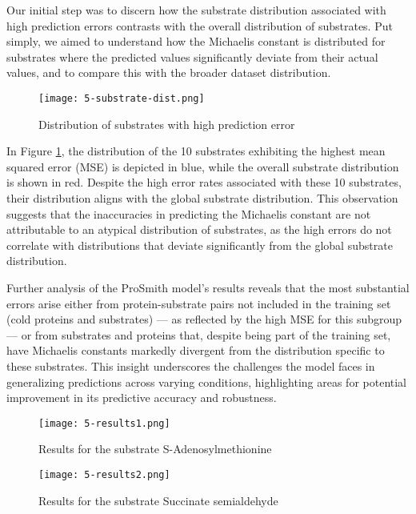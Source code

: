 Our initial step was to discern how the substrate distribution associated with high prediction errors contrasts with the overall distribution of substrates. Put simply, we aimed to understand how the Michaelis constant is distributed for substrates where the predicted values significantly deviate from their actual values, and to compare this with the broader dataset distribution.

\begin{figure}
    \centering
    \texttt{[image: 5-substrate-dist.png]}
    \caption{Distribution of substrates with high prediction error}
    \label{fig:substratedist}
\end{figure}

In Figure \ref{fig:substratedist}, the distribution of the 10 substrates exhibiting the highest mean squared error (MSE) is depicted in blue, while the overall substrate distribution is shown in red. Despite the high error rates associated with these 10 substrates, their distribution aligns with the global substrate distribution. This observation suggests that the inaccuracies in predicting the Michaelis constant are not attributable to an atypical distribution of substrates, as the high errors do not correlate with distributions that deviate significantly from the global substrate distribution.

Further analysis of the ProSmith model's results reveals that the most substantial errors arise either from protein-substrate pairs not included in the training set (cold proteins and substrates) — as reflected by the high MSE for this subgroup — or from substrates and proteins that, despite being part of the training set, have Michaelis constants markedly divergent from the distribution specific to these substrates. This insight underscores the challenges the model faces in generalizing predictions across varying conditions, highlighting areas for potential improvement in its predictive accuracy and robustness.

\begin{figure}
    \centering
    \texttt{[image: 5-results1.png]}
    \caption{Results for the substrate S-Adenosylmethionine}
    \label{fig:sub1}
  \end{figure}

\begin{figure}
    \centering
    \texttt{[image: 5-results2.png]}
    \caption{Results for the substrate Succinate semialdehyde}
    \label{fig:sub2}
  \end{figure}

